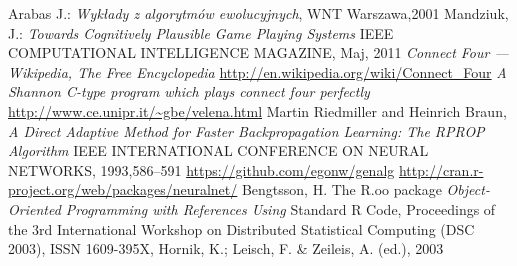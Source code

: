 \documentclass{llncs}
\begin{document}
%
%
\begin{thebibliography}{4}
%
Arabas J.:
\textsl{Wykłady z algorytmów ewolucyjnych}, WNT Warszawa,2001
Mandziuk, J.:
\textsl{Towards Cognitively Plausible Game Playing Systems}
IEEE COMPUTATIONAL INTELLIGENCE MAGAZINE, Maj, 2011
\textsl{Connect Four --- {W}ikipedia{,} The Free Encyclopedia}
\url{http://en.wikipedia.org/wiki/Connect_Four}
\textsl{A Shannon C-type program which plays connect four perfectly}
\url{http://www.ce.unipr.it/~gbe/velena.html}
Martin Riedmiller and Heinrich Braun,
\textsl{A Direct Adaptive Method for Faster Backpropagation Learning: The RPROP Algorithm}
IEEE INTERNATIONAL CONFERENCE ON NEURAL NETWORKS, 1993,586--591
\url{https://github.com/egonw/genalg}
\url{http://cran.r-project.org/web/packages/neuralnet/}
Bengtsson, H. The R.oo package
\textsl{Object-Oriented Programming with References Using}
Standard R Code, Proceedings of the 3rd International Workshop on Distributed
Statistical Computing (DSC 2003), ISSN 1609-395X, Hornik, K.; Leisch, F. \& Zeileis,
A. (ed.), 2003
\end{thebibliography}
\end{document}
